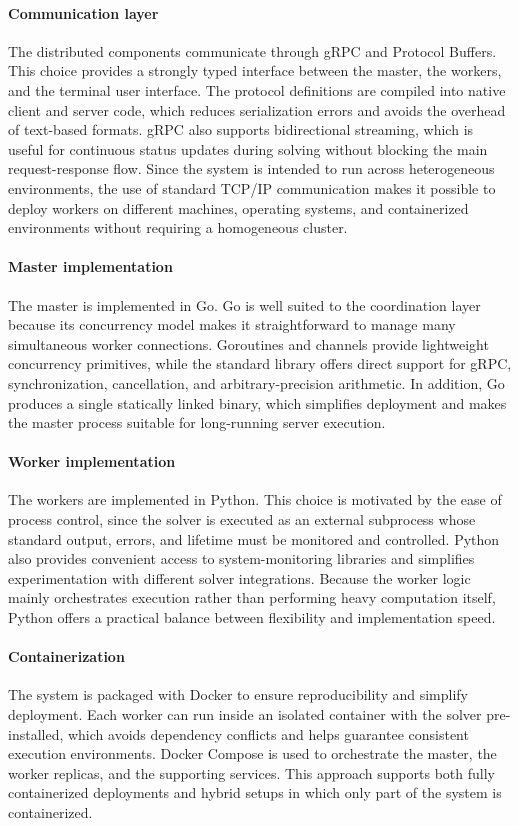 \documentclass{report}
\begin{document}
\paragraph{Communication layer}
The distributed components communicate through gRPC and Protocol Buffers. 
This choice provides a strongly typed interface between the master, the workers, 
and the terminal user interface. The protocol definitions are compiled into native client and server code, 
which reduces serialization errors and avoids the overhead of text-based formats.
gRPC also supports bidirectional streaming, which is useful for continuous status updates during 
solving without blocking the main request-response flow. Since the system is intended to run across heterogeneous environments, 
the use of standard TCP/IP communication makes it possible to deploy workers on different machines, 
operating systems, and containerized environments without requiring a homogeneous cluster.

\paragraph{Master implementation}
The master is implemented in Go. Go is well suited to the coordination layer because 
its concurrency model makes it straightforward to manage many simultaneous worker connections.
Goroutines and channels provide lightweight concurrency primitives, while the standard library offers direct support for gRPC, 
synchronization, cancellation, and arbitrary-precision arithmetic. In addition, Go produces a
single statically linked binary, which simplifies deployment and makes the master process suitable for long-running server execution.

\paragraph{Worker implementation}
The workers are implemented in Python. This choice is motivated by the ease of process control,
since the solver is executed as an external subprocess whose standard output, errors, 
and lifetime must be monitored and controlled. Python also provides convenient access to 
system-monitoring libraries and simplifies experimentation with different solver integrations. 
Because the worker logic mainly orchestrates execution rather than performing heavy computation itself, 
Python offers a practical balance between flexibility and implementation speed.

\paragraph{Containerization}
The system is packaged with Docker to ensure reproducibility and simplify deployment.
Each worker can run inside an isolated container with the solver pre-installed, 
which avoids dependency conflicts and helps guarantee consistent execution environments. 
Docker Compose is used to orchestrate the master, the worker replicas, and the supporting services. 
This approach supports both fully containerized deployments and hybrid setups in which only part of the system is containerized.
\end{document}
